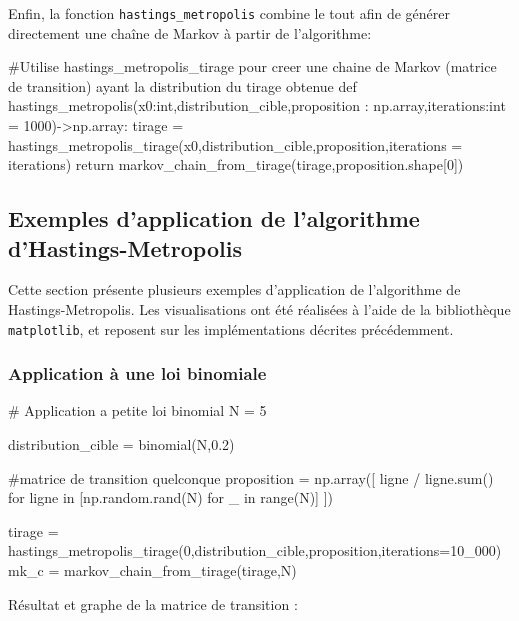 \documentclass{article}
\begin{document}
Enfin, la fonction \texttt{hastings\_metropolis} combine le tout afin de générer directement une chaîne de Markov à partir de l'algorithme:

\begin{python}
#Utilise hastings_metropolis_tirage pour creer une chaine de Markov (matrice de transition) ayant la distribution du tirage obtenue  
def hastings_metropolis(x0:int,distribution_cible,proposition : np.array,iterations:int = 1000)->np.array:
    tirage = hastings_metropolis_tirage(x0,distribution_cible,proposition,iterations = iterations)
    return markov_chain_from_tirage(tirage,proposition.shape[0])    
\end{python}

\newpage
\subsection{Exemples d'application de l'algorithme d'Hastings-Metropolis}

Cette section présente plusieurs exemples d'application de l'algorithme de Hastings-Metropolis. Les visualisations ont été réalisées à l'aide de la bibliothèque \texttt{matplotlib}, et reposent sur les implémentations décrites précédemment.

\subsubsection{Application à une loi binomiale}

\begin{center}
\begin{python}
# Application a petite loi binomial
N = 5

distribution_cible = binomial(N,0.2)

#matrice de transition quelconque
proposition = np.array([ ligne / ligne.sum()
    for ligne in [np.random.rand(N) for _ in range(N)]
])

tirage = hastings_metropolis_tirage(0,distribution_cible,proposition,iterations=10_000)
mk_c = markov_chain_from_tirage(tirage,N)
\end{python}
\end{center}
Résultat et graphe de la matrice de transition :
\end{document}
